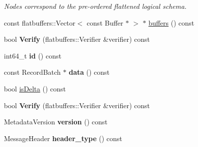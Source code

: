 \begin{DoxyCompactItemize}
\begin{DoxyCompactList}\small\item\em Nodes correspond to the pre-\/ordered flattened logical schema. \end{DoxyCompactList}\item 
const flatbuffers\+::\+Vector$<$ const Buffer $\ast$ $>$ $\ast$ \hyperlink{structorg_1_1apache_1_1arrow_1_1flatbuf_1_1FLATBUFFERS__FINAL__CLASS_a00a1e3efc7f08d49bc2647967c10dc4e}{buffers} () const 
\item 
bool {\bfseries Verify} (flatbuffers\+::\+Verifier \&verifier) const \hypertarget{structorg_1_1apache_1_1arrow_1_1flatbuf_1_1FLATBUFFERS__FINAL__CLASS_af3e217fc40beb9b315e3979010413969}{}\label{structorg_1_1apache_1_1arrow_1_1flatbuf_1_1FLATBUFFERS__FINAL__CLASS_af3e217fc40beb9b315e3979010413969}

\item 
int64\+\_\+t {\bfseries id} () const \hypertarget{structorg_1_1apache_1_1arrow_1_1flatbuf_1_1FLATBUFFERS__FINAL__CLASS_a228576dd5bc73c49a95d44c56d910250}{}\label{structorg_1_1apache_1_1arrow_1_1flatbuf_1_1FLATBUFFERS__FINAL__CLASS_a228576dd5bc73c49a95d44c56d910250}

\item 
const Record\+Batch $\ast$ {\bfseries data} () const \hypertarget{structorg_1_1apache_1_1arrow_1_1flatbuf_1_1FLATBUFFERS__FINAL__CLASS_ac804561a7b1c02345de274476650e75a}{}\label{structorg_1_1apache_1_1arrow_1_1flatbuf_1_1FLATBUFFERS__FINAL__CLASS_ac804561a7b1c02345de274476650e75a}

\item 
bool \hyperlink{structorg_1_1apache_1_1arrow_1_1flatbuf_1_1FLATBUFFERS__FINAL__CLASS_a753f594feb01fa8aac729d9cef045242}{is\+Delta} () const 
\item 
bool {\bfseries Verify} (flatbuffers\+::\+Verifier \&verifier) const \hypertarget{structorg_1_1apache_1_1arrow_1_1flatbuf_1_1FLATBUFFERS__FINAL__CLASS_af3e217fc40beb9b315e3979010413969}{}\label{structorg_1_1apache_1_1arrow_1_1flatbuf_1_1FLATBUFFERS__FINAL__CLASS_af3e217fc40beb9b315e3979010413969}

\item 
Metadata\+Version {\bfseries version} () const \hypertarget{structorg_1_1apache_1_1arrow_1_1flatbuf_1_1FLATBUFFERS__FINAL__CLASS_a581ef6387b085df698f948cfeb515f3c}{}\label{structorg_1_1apache_1_1arrow_1_1flatbuf_1_1FLATBUFFERS__FINAL__CLASS_a581ef6387b085df698f948cfeb515f3c}

\item 
Message\+Header {\bfseries header\+\_\+type} () const \hypertarget{structorg_1_1apache_1_1arrow_1_1flatbuf_1_1FLATBUFFERS__FINAL__CLASS_ad89656f1b8d7c4e21886fbcca9912368}{}\label{structorg_1_1apache_1_1arrow_1_1flatbuf_1_1FLATBUFFERS__FINAL__CLASS_ad89656f1b8d7c4e21886fbcca9912368}


\end{DoxyCompactItemize}
